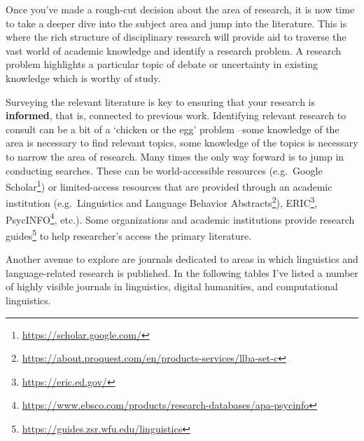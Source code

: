 \documentclass[
  letterpaper,
]{latex/krantz}
\DeclareRobustCommand{\href}[2]{#2\footnote{\url{#1}}}
\begin{document}
Once you've made a rough-cut decision about the area of research, it is
now time to take a deeper dive into the subject area and jump into the
literature. This is where the rich structure of disciplinary research
will provide aid to traverse the vast world of academic knowledge and
identify a research problem. A research problem highlights a particular
topic of debate or uncertainty in existing knowledge which is worthy of
study.

Surveying the relevant literature is key to ensuring that your research
is \textbf{informed}, that is, connected to previous work. Identifying
relevant research to consult can be a bit of a `chicken or the egg'
problem --some knowledge of the area is necessary to find relevant
topics, some knowledge of the topics is necessary to narrow the area of
research. Many times the only way forward is to jump in conducting
searches. These can be world-accessible resources
(e.g.~\href{https://scholar.google.com/}{Google Scholar}) or
limited-access resources that are provided through an academic
institution
(e.g.~\href{https://about.proquest.com/en/products-services/llba-set-c}{Linguistics
and Language Behavior Abstracts}), \href{https://eric.ed.gov/}{ERIC},
\href{https://www.ebsco.com/products/research-databases/apa-psycinfo}{PsycINFO},
etc.). Some organizations and academic institutions provide
\href{https://guides.zsr.wfu.edu/linguistics}{research guides} to help
researcher's access the primary literature.

Another avenue to explore are journals dedicated to areas in which
linguistics and language-related research is published. In the following
tables I've listed a number of highly visible journals in linguistics,
digital humanities, and computational linguistics.
\end{document}
